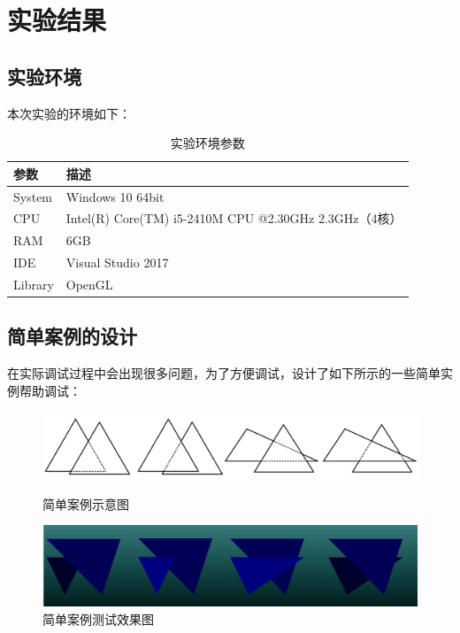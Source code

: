 \documentclass[10pt]{article}
\begin{document}
\section{实验结果}
\subsection{实验环境}
本次实验的环境如下：
\begin{table}[H]
\caption{实验环境参数}
\begin{center}
\begin{tabular}{ll}
\toprule  %
参数& 描述\\
\midrule  %
System& Windows 10 64bit \\
CPU& Intel(R) Core(TM) i5-2410M CPU @2.30GHz 2.3GHz（4核）\\
RAM& 6GB\\
IDE& Visual Studio 2017 \\
Library& OpenGL\\
\bottomrule %
\end{tabular}
\end{center}
\end{table}

\subsection{简单案例的设计}
在实际调试过程中会出现很多问题，为了方便调试，设计了如下所示的一些简单实例帮助调试：
\begin{figure}[H]
\setlength{\abovecaptionskip}{2pt}
\setlength{\belowcaptionskip}{20pt}
\begin{center}
\includegraphics[scale=0.6]{cases1.png}
\caption{简单案例示意图}
\includegraphics[scale=0.5]{cases2.png}
\caption{简单案例测试效果图}
\end{center}
\end{figure}
\end{document}
